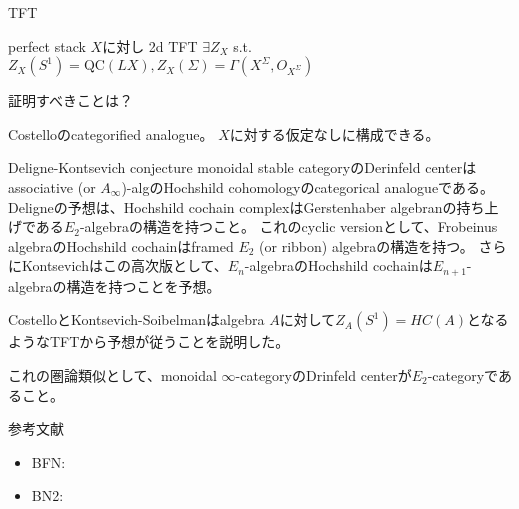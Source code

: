 \documentclass[dvipdfmx]{beamer}
\newcommand{\QC}{\mathrm{QC}}
\begin{document}
\begin{frame}{TFT}
\begin{dfn}
\end{dfn}

\begin{prop}
perfect stack $X$に対し 2d TFT $\exists Z_X$ s.t. $Z_X(S^1)=\QC(LX), Z_X(\Sigma)=\Gamma(X^\Sigma, O_{X^\Sigma})$
\end{prop}
証明すべきことは？

Costelloのcategorified analogue。
$X$に対する仮定なしに構成できる。
\end{frame}

\begin{frame}{Deligne-Kontsevich conjecture}
monoidal stable categoryのDerinfeld centerはassociative (or $A_\infty$)-algのHochshild cohomologyのcategorical analogueである。
Deligneの予想は、Hochshild cochain complexはGerstenhaber algebranの持ち上げである$E_2$-algebraの構造を持つこと。
これのcyclic versionとして、Frobeinus algebraのHochshild cochainはframed $E_2$ (or ribbon) algebraの構造を持つ。
さらにKontsevichはこの高次版として、$E_n$-algebraのHochshild cochainは$E_{n+1}$-algebraの構造を持つことを予想。

CostelloとKontsevich-Soibelmanはalgebra $A$に対して$Z_A(S^1)=HC(A)$となるようなTFTから予想が従うことを説明した。

これの圏論類似として、monoidal $\infty$-categoryのDrinfeld centerが$E_2$-categoryであること。
\end{frame}

\begin{frame}{参考文献}
\begin{itemize}
\item BFN:
\item BN2:
\end{itemize}
\end{frame}
\end{document}
